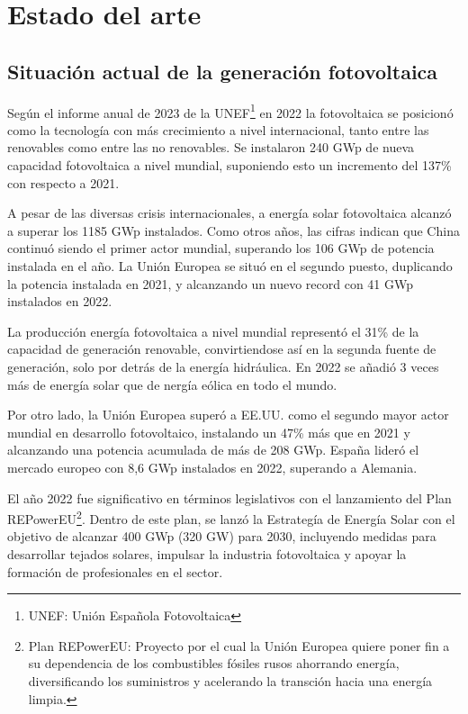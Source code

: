 \chapter{Estado del arte}
\section{Situación actual de la generación fotovoltaica}
\label{sec:org4fc0d27}
Según el informe anual de 2023 de la UNEF\footnote{UNEF: Unión Española Fotovoltaica}\cite{unef23} en 2022 la fotovoltaica se posicionó como la tecnología con más crecimiento a nivel internacional, tanto entre las renovables como entre las no renovables. Se instalaron 240 GWp de nueva capacidad fotovoltaica a nivel mundial, suponiendo esto un incremento del 137\% con respecto a 2021.

A pesar de las diversas crisis internacionales, a energía solar fotovoltaica alcanzó a superar los 1185 GWp instalados. Como otros años, las cifras indican que China continuó siendo el primer actor mundial, superando los 106 GWp de potencia instalada en el año. La Unión Europea se situó en el segundo puesto, duplicando la potencia instalada en 2021, y alcanzando un nuevo record con 41 GWp instalados en 2022.

La producción energía fotovoltaica a nivel mundial representó el 31\% de la capacidad de generación renovable, convirtiendose así en la segunda fuente de generación, solo por detrás de la energía hidráulica. En 2022 se añadió 3 veces más de energía solar que de nergía eólica en todo el mundo.

Por otro lado, la Unión Europea superó a EE.UU. como el segundo mayor actor mundial en desarrollo fotovoltaico, instalando un 47\% más que en 2021 y alcanzando una potencia acumulada de más de 208 GWp. España lideró el mercado europeo con 8,6 GWp instalados en 2022, superando a Alemania.

El año 2022 fue significativo en términos legislativos con el lanzamiento del Plan REPowerEU\footnote{Plan REPowerEU: Proyecto por el cual la Unión Europea quiere poner fin a su dependencia de los combustibles fósiles rusos ahorrando energía, diversificando los suministros y acelerando la transción hacia una energía limpia.}\cite{europeo22}. Dentro de este plan, se lanzó la Estrategía de Energía Solar con el objetivo de alcanzar 400 GWp (320 GW) para 2030, incluyendo medidas para desarrollar tejados solares, impulsar la industria fotovoltaica y apoyar la formación de profesionales en el sector.

